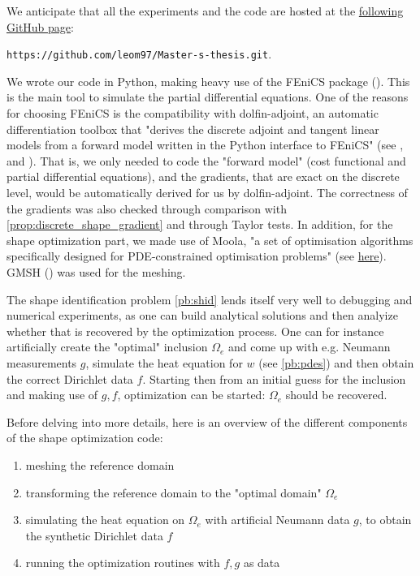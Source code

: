 \documentclass[english,a4paper,9pt,oneside]{scrbook}	%
\theoremstyle{break}
\theoremstyle{remark}
\begin{document}
We anticipate that all the experiments and the code are hosted at the \href{https://github.com/leom97/Master-s-thesis.git}{following GitHub page}: 
\begin{center}
\texttt{https://github.com/leom97/Master-s-thesis.git}.
\end{center}
We wrote our code in Python, making heavy use of the FEniCS package (\cite{fenics}). This is the main tool to simulate the partial differential equations. One of the reasons for choosing FEniCS is the compatibility with dolfin-adjoint, an automatic differentiation toolbox that "derives the discrete adjoint and tangent linear models from a forward model written in the Python interface to FEniCS" (see \cite{dolfin-adjoint_1}, \cite{dolfin-adjoint_2} and \cite{dolfin-adjoint_3}). That is, we only needed to code the "forward model" (cost functional and partial differential equations), and the gradients, that are exact on the discrete level, would be automatically derived for us by dolfin-adjoint. The correctness of the gradients was also checked through comparison with \cref{prop:discrete_shape_gradient} and through Taylor tests. In addition, for the shape optimization part, we made use of Moola, "a set of optimisation algorithms specifically designed for PDE-constrained optimisation problems" (see \href{https://github.com/funsim/moola}{here}). GMSH (\cite{gmsh}) was used for the meshing.

The shape identification problem \cref{pb:shid} lends itself very well to debugging and numerical experiments, as one can build analytical solutions and then analyize whether that is recovered by the optimization process. One can for instance artificially create the "optimal" inclusion $\Omega_e$ and come up with e.g. Neumann measurements $g$, simulate the heat equation for $w$ (see \cref{pb:pdes}) and then obtain the correct Dirichlet data $f$. Starting then from an initial guess for the inclusion and making use of $g,f$, optimization can be started: $\Omega_e$ should be recovered.

Before delving into more details, here is an overview of the different components of the shape optimization code:
\begin{enumerate}
	\item meshing the reference domain
	\item transforming the reference domain to the "optimal domain" $\Omega_e$
	\item simulating the heat equation on $\Omega_e$ with artificial Neumann data $g$, to obtain the synthetic Dirichlet data $f$
	\item running the optimization routines with $f,g$ as data
\end{enumerate}
\end{document}
